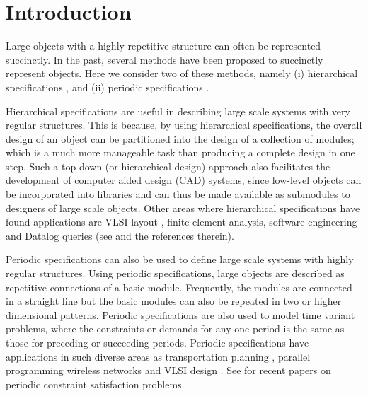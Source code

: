 \section{Introduction}
\label{sec:intro}

Large objects with a highly repetitive structure can often be represented
succinctly.
In the past, several methods have been proposed to succinctly 
represent objects.
Here we consider two of these methods, namely
(i) hierarchical specifications  
\cite{Ga82,GW83,LW92,BOW83,RH93},
and (ii) periodic specifications 
\cite{CM91,HW92,IS87,KO91,KS88,Or82a,Wa93}.
 


Hierarchical specifications are useful in describing large scale systems with
very regular structures. This is because, 
by using hierarchical specifications, the overall design of an object can be 
partitioned into the design of a collection of modules;
which is a 
much more manageable task than producing a complete design in one step.
Such a top down (or hierarchical design) approach 
also facilitates the development of computer aided design (CAD) systems, since
low-level objects can be  incorporated into libraries and can thus be made
available as submodules to designers of large scale  objects.
Other areas where hierarchical specifications have found applications are
VLSI layout \cite{HLW92,HW92,RH93},  
finite element analysis, software engineering and Datalog queries 
(see \cite{HLW92,Ma94,marathe1995complexity,bottcher2020simulation,goller2005fixpoint,brenguier2012comparison,lohrey2012model} 
and the references therein). 

Periodic specifications
can also be used to define large scale systems with highly regular structures.
Using  periodic specifications, 
large objects are  described as repetitive connections of a basic module.
Frequently, the modules are connected in a straight line 
but the basic modules can also  be repeated in two or higher
dimensional patterns. Periodic specifications are also used to 
model time variant  problems,  where the constraints
or demands  for any one period is the same as those for preceding or 
succeeding periods. 
 Periodic specifications 
have applications in such diverse areas  as  transportation planning
\cite{Or82a,HLW92,marathe1995complexity},
parallel programming \cite{HLW92,KMW67} wireless networks \cite{andreou2002radiocoloring} and 
VLSI design \cite{IS87,IS88}. See \cite{chen2003periodic,chen2005periodic} for recent 
papers on periodic constraint satisfaction problems.

